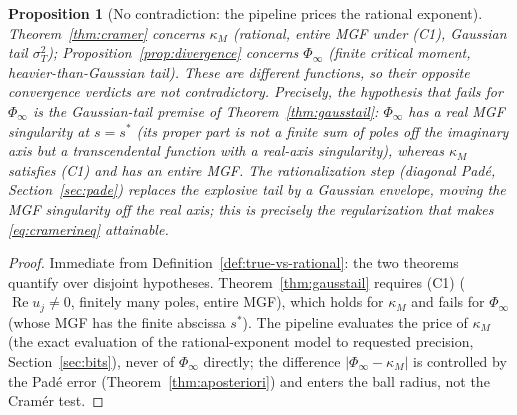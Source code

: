\documentclass[11pt]{article}
\DeclareMathOperator{\Real}{Re}
\theoremstyle{plain}
\newtheorem{proposition}[theorem]{Proposition}
\theoremstyle{definition}
\theoremstyle{remark}
\begin{document}
\begin{proposition}[No contradiction: the pipeline prices the rational exponent]
\label{prop:no-contradiction}
Theorem~\ref{thm:cramer} concerns $\kappa_M$ (rational, entire MGF under
\textup{(C1)}, Gaussian tail $\sigma_T^2$); Proposition~\ref{prop:divergence}
concerns $\Phi_\infty$ (finite critical moment, heavier-than-Gaussian tail). These
are different functions, so their opposite convergence verdicts are not
contradictory. Precisely, the hypothesis that fails for $\Phi_\infty$ is the
Gaussian-tail premise of Theorem~\ref{thm:gausstail}: $\Phi_\infty$ has a real MGF
singularity at $s=s^\ast$ (its proper part is not a finite sum of poles off the
imaginary axis but a transcendental function with a real-axis singularity), whereas
$\kappa_M$ satisfies \textup{(C1)} and has an entire MGF. The rationalization step
(diagonal Padé, Section~\ref{sec:pade}) replaces the explosive tail by a Gaussian
envelope, moving the MGF singularity off the real axis; this is precisely the
regularization that makes \eqref{eq:cramerineq} attainable.
\end{proposition}
\begin{proof}
Immediate from Definition~\ref{def:true-vs-rational}: the two theorems quantify over
disjoint hypotheses. Theorem~\ref{thm:gausstail} requires \textup{(C1)}
($\Real u_j\ne0$, finitely many poles, entire MGF), which holds for $\kappa_M$ and
fails for $\Phi_\infty$ (whose MGF has the finite abscissa $s^\ast$). The pipeline
evaluates the price of $\kappa_M$ (the exact evaluation of the rational-exponent
model to requested precision, Section~\ref{sec:bits}), never of $\Phi_\infty$
directly; the difference $|\Phi_\infty-\kappa_M|$ is controlled by the Padé error
(Theorem~\ref{thm:aposteriori}) and enters the ball radius, not the Cramér test.
\end{proof}
\end{document}
